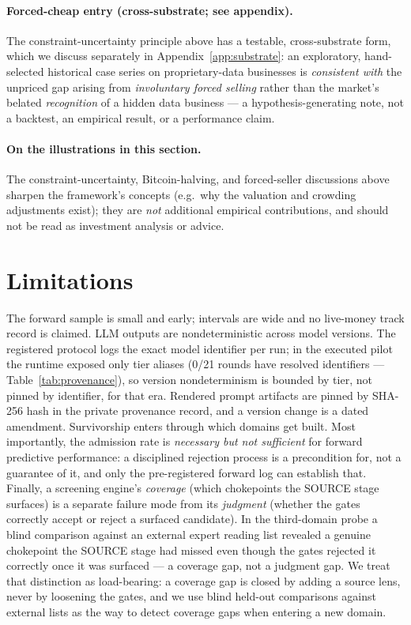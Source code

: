 \documentclass[11pt]{article}
\begin{document}
\paragraph{Forced-cheap entry (cross-substrate; see appendix).} The constraint-uncertainty principle
above has a testable, cross-substrate form, which we discuss separately in
Appendix~\ref{app:substrate}: an exploratory, hand-selected historical case series on
proprietary-data businesses is \emph{consistent with} the unpriced gap arising from
\emph{involuntary forced selling} rather than the market's belated \emph{recognition} of a hidden
data business --- a hypothesis-generating note, not a backtest, an empirical result, or a
performance claim.

\paragraph{On the illustrations in this section.} The constraint-uncertainty, Bitcoin-halving, and
forced-seller discussions above sharpen the framework's concepts (e.g.\ why the valuation and crowding
adjustments exist); they are \emph{not} additional empirical contributions, and should not be read as
investment analysis or advice.

\section{Limitations}
The forward sample is small and early; intervals are wide and no live-money track record is claimed.
LLM outputs are nondeterministic across model versions. The registered protocol logs the exact
model identifier per run; in the executed pilot the runtime exposed only tier aliases (0/21 rounds
have resolved identifiers --- Table~\ref{tab:provenance}), so version nondeterminism is bounded by
tier, not pinned by identifier, for that era. Rendered prompt artifacts are pinned by SHA-256 hash
in the private provenance record, and a version change is a dated amendment. Survivorship enters through
which domains get built. Most importantly, the admission rate is \emph{necessary but not sufficient}
for forward predictive performance: a disciplined rejection process is a precondition for, not a
guarantee of it, and only the pre-registered forward log can establish that. Finally, a screening engine's
\emph{coverage} (which chokepoints the SOURCE stage surfaces) is a separate failure mode from its
\emph{judgment} (whether the gates correctly accept or reject a surfaced candidate). In the
third-domain probe a blind comparison against an external expert reading list revealed a genuine
chokepoint the SOURCE stage had missed even though the gates rejected it correctly once it was
surfaced --- a coverage gap, not a judgment gap. We treat that distinction as load-bearing: a coverage
gap is closed by adding a source lens, never by loosening the gates, and we use blind held-out
comparisons against external lists as the way to detect coverage gaps when entering a new domain.
\end{document}

